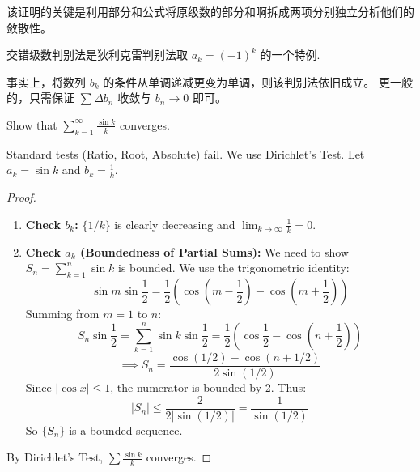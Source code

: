 \documentclass[
	UTF-8,
	11pt, %
	a4paper, %
]{LegrandOrangeBook}
\begin{document}
    \begin{remark}
        该证明的关键是利用部分和公式将原级数的部分和啊拆成两项分别独立分析他们的敛散性。
    \end{remark}

    \begin{remark}
        交错级数判别法是狄利克雷判别法取 $a_k = (-1)^k$ 的一个特例.
    \end{remark}

    \begin{remark}
        事实上，将数列 $b_k$ 的条件从单调递减更变为单调，则该判别法依旧成立。
        更一般的，只需保证 $\sum \Delta b_n$ 收敛与 $b_n \to 0$ 即可。
    \end{remark}

    \newpage

    \begin{example}
    Show that $\displaystyle \sum_{k=1}^\infty \frac{\sin k}{k}$ converges.

    \begin{analysis}
        Standard tests (Ratio, Root, Absolute) fail. We use Dirichlet's Test.
    Let $a_k = \sin k$ and $b_k = \frac{1}{k}$.
    \end{analysis}
    \begin{proof}
        \begin{enumerate}
            \item \textbf{Check $b_k$:} $\{1/k\}$ is clearly decreasing and $\lim_{k \to \infty} \frac{1}{k} = 0$.
            \item \textbf{Check $a_k$ (Boundedness of Partial Sums):}
            We need to show $S_n = \sum_{k=1}^n \sin k$ is bounded. We use the trigonometric identity:
            \[ \sin m \sin \frac{1}{2} = \frac{1}{2} \left( \cos(m - \frac{1}{2}) - \cos(m + \frac{1}{2}) \right) \]
            Summing from $m=1$ to $n$:
            \[ S_n \sin \frac{1}{2} = \sum_{k=1}^n \sin k \sin \frac{1}{2} = \frac{1}{2} \left( \cos \frac{1}{2} - \cos(n + \frac{1}{2}) \right) \]
            \[ \implies S_n = \frac{\cos(1/2) - \cos(n + 1/2)}{2 \sin(1/2)} \]
            Since $|\cos x| \le 1$, the numerator is bounded by 2. Thus:
            \[ |S_n| \le \frac{2}{2 |\sin(1/2)|} = \frac{1}{\sin(1/2)} \]
            So $\{S_n\}$ is a bounded sequence.
        \end{enumerate}
        By Dirichlet's Test, $\displaystyle\sum \frac{\sin k}{k}$ converges.
    \end{proof}
    \end{example}
\end{document}
